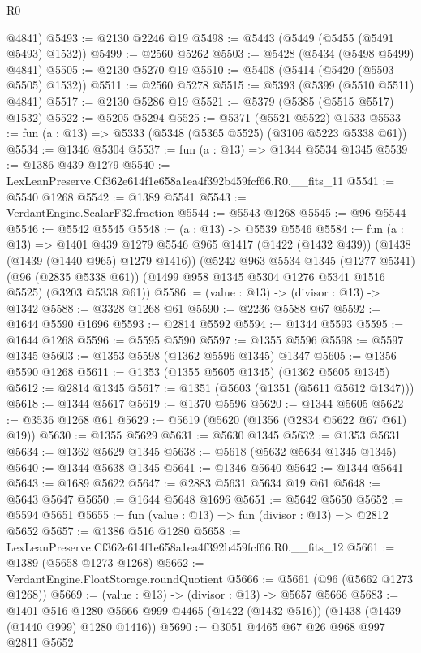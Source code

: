 \begin{lexlean}{R0}
\begin{coremodule}
      @4841)
@5493 := @2130 @2246 @19
@5498 := @5443 (@5449 (@5455 (@5491 @5493) @1532))
@5499 := @2560 @5262
@5503 := @5428 (@5434 (@5498 @5499) @4841)
@5505 := @2130 @5270 @19
@5510 := @5408 (@5414 (@5420 (@5503 @5505) @1532))
@5511 := @2560 @5278
@5515 := @5393 (@5399 (@5510 @5511) @4841)
@5517 := @2130 @5286 @19
@5521 := @5379 (@5385 (@5515 @5517) @1532)
@5522 := @5205 @5294
@5525 := @5371 (@5521 @5522) @1533
@5533 := fun (a : @13) => @5333 (@5348 (@5365 @5525) (@3106 @5223 @5338 @61))
@5534 := @1346 @5304
@5537 := fun (a : @13) => @1344 @5534 @1345
@5539 := @1386 @439 @1279
@5540 := LexLeanPreserve.Cf362e614f1e658a1ea4f392b459fcf66.R0.__fits_11
@5541 := @5540 @1268
@5542 := @1389 @5541
@5543 := VerdantEngine.ScalarF32.fraction
@5544 := @5543 @1268
@5545 := @96 @5544
@5546 := @5542 @5545
@5548 := (a : @13) -> @5539 @5546
@5584 := fun (a : @13) =>
  @1401
    @439
    @1279
    @5546
    @965
    @1417
    (@1422 (@1432 @439))
    (@1438 (@1439 (@1440 @965) @1279 @1416))
    (@5242
      @963
      @5534
      @1345
      (@1277 @5341)
      (@96 (@2835 @5338 @61))
      (@1499 @958 @1345 @5304 @1276 @5341 @1516 @5525)
      (@3203 @5338 @61))
@5586 := (value : @13) -> (divisor : @13) -> @1342
@5588 := @3328 @1268 @61
@5590 := @2236 @5588 @67
@5592 := @1644 @5590 @1696
@5593 := @2814 @5592
@5594 := @1344 @5593
@5595 := @1644 @1268
@5596 := @5595 @5590
@5597 := @1355 @5596
@5598 := @5597 @1345
@5603 := @1353 @5598 (@1362 @5596 @1345) @1347
@5605 := @1356 @5590 @1268
@5611 := @1353 (@1355 @5605 @1345) (@1362 @5605 @1345)
@5612 := @2814 @1345
@5617 := @1351 (@5603 (@1351 (@5611 @5612 @1347)))
@5618 := @1344 @5617
@5619 := @1370 @5596
@5620 := @1344 @5605
@5622 := @3536 @1268 @61
@5629 := @5619 (@5620 (@1356 (@2834 @5622 @67 @61) @19))
@5630 := @1355 @5629
@5631 := @5630 @1345
@5632 := @1353 @5631
@5634 := @1362 @5629 @1345
@5638 := @5618 (@5632 @5634 @1345 @1345)
@5640 := @1344 @5638 @1345
@5641 := @1346 @5640
@5642 := @1344 @5641
@5643 := @1689 @5622
@5647 := @2883 @5631 @5634 @19 @61
@5648 := @5643 @5647
@5650 := @1644 @5648 @1696
@5651 := @5642 @5650
@5652 := @5594 @5651
@5655 := fun (value : @13) => fun (divisor : @13) => @2812 @5652
@5657 := @1386 @516 @1280
@5658 := LexLeanPreserve.Cf362e614f1e658a1ea4f392b459fcf66.R0.__fits_12
@5661 := @1389 (@5658 @1273 @1268)
@5662 := VerdantEngine.FloatStorage.roundQuotient
@5666 := @5661 (@96 (@5662 @1273 @1268))
@5669 := (value : @13) -> (divisor : @13) -> @5657 @5666
@5683 := @1401
    @516
    @1280
    @5666
    @999
    @4465
    (@1422 (@1432 @516))
    (@1438 (@1439 (@1440 @999) @1280 @1416))
@5690 := @3051 @4465 @67 @26 @968 @997 @2811 @5652

\end{coremodule}
\end{lexlean}
